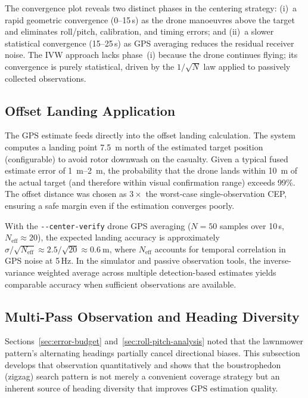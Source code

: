 \noindent The convergence plot reveals two distinct phases in the centering strategy: (i)~a rapid geometric convergence (0--15\,s) as the drone manoeuvres above the target and eliminates roll/pitch, calibration, and timing errors; and (ii)~a slower statistical convergence (15--25\,s) as GPS averaging reduces the residual receiver noise.  The IVW approach lacks phase~(i) because the drone continues flying; its convergence is purely statistical, driven by the $1/\sqrt{N}$ law applied to passively collected observations.
\subsection{Offset Landing Application}\label{sec:offset-landing}

The GPS estimate feeds directly into the offset landing calculation.  The system computes a landing point \SI{7.5}{\metre} north of the estimated target position (configurable) to avoid rotor downwash on the casualty.  Given a typical fused estimate error of \SIrange{1}{2}{\metre}, the probability that the drone lands within \SI{10}{\metre} of the actual target (and therefore within visual confirmation range) exceeds 99\%.  The offset distance was chosen as $3\times$ the worst-case single-observation CEP, ensuring a safe margin even if the estimation converges poorly.

With the \texttt{-{}-center-verify} drone GPS averaging ($N = 50$ samples over 10\,s, $N_\mathrm{eff} \approx 20$), the expected landing accuracy is approximately $\sigma / \sqrt{N_\mathrm{eff}} \approx 2.5 / \sqrt{20} \approx \SI{0.6}{\metre}$, where $N_\mathrm{eff}$ accounts for temporal correlation in GPS noise at 5\,Hz.  In the simulator and passive observation tools, the inverse-variance weighted average across multiple detection-based estimates yields comparable accuracy when sufficient observations are available.

\subsection{Multi-Pass Observation and Heading Diversity}\label{sec:multi-pass}

Sections~\ref{sec:error-budget} and~\ref{sec:roll-pitch-analysis} noted that the lawnmower pattern's alternating headings partially cancel directional biases.  This subsection develops that observation quantitatively and shows that the boustrophedon (zigzag) search pattern is not merely a convenient coverage strategy but an inherent source of heading diversity that improves GPS estimation quality.

